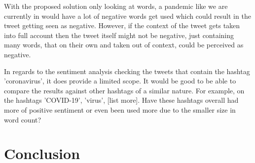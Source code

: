 \documentclass[a4paper,10pt]{article}
\begin{document}
With the proposed solution only looking at words, a pandemic like we are currently in would have a lot of negative words get used which could result in the tweet getting seen as negative. However, if the context of the tweet gets taken into full account then the tweet itself might not be negative, just containing many words, that on their own and taken out of context, could be perceived as negative.

In regards to the sentiment analysis checking the tweets that contain the hashtag 'coronavirus', it does provide a limited scope. It would be good to be able to compare the results against other hashtags of a similar nature. For example, on the hashtags 'COVID-19', 'virus', [list more]. Have these hashtags overall had more of positive sentiment or even been used more due to the smaller size in word count?

\section{Conclusion}




\newpage
%	

	
	
	
\end{document}
